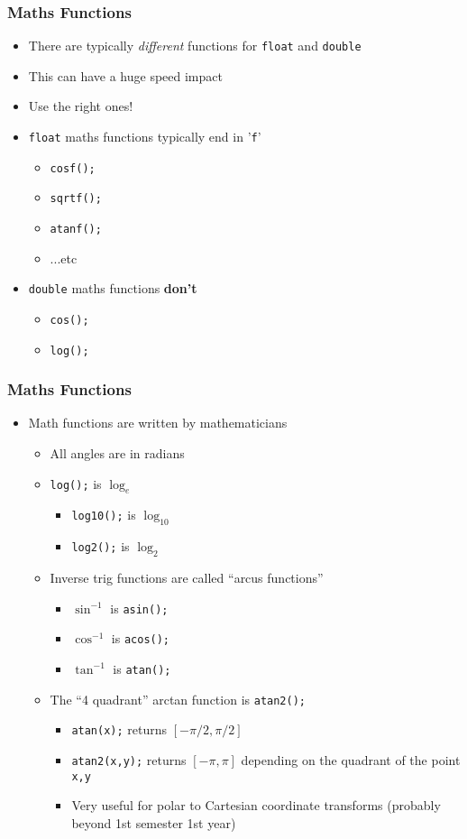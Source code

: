 \documentclass[14pt]{beamer}
\begin{document}
\begin{frame}
\frametitle{Maths Functions}
\begin{itemize}
\item There are typically \textit{different} functions for \texttt{float} and \texttt{double}
\item This can have a huge speed impact
\item Use the right ones!
\item \texttt{float} maths functions typically end in '\texttt{f}'
	\begin{itemize}
		\item \texttt{cosf();}
		\item \texttt{sqrtf();}
		\item \texttt{atanf();}
		\item ...etc
	\end{itemize}
\item \texttt{double} maths functions \textbf{don't}
	\begin{itemize}
		\item \texttt{cos();}
		\item \texttt{log();}
	\end{itemize}
\end{itemize}
\end{frame}

\begin{frame}
\frametitle{Maths Functions}
\begin{itemize}
\item Math functions are written by mathematicians
	\begin{itemize}
		\item All angles are in radians
		\pause
		\item \texttt{log();} is $\log_e$
			\begin{itemize}
				\item \texttt{log10();} is $\log_{10}$
				\item \texttt{log2();} is $\log_2$
			\end{itemize}
		\pause
		\item Inverse trig functions are called ``arcus functions''
			\begin{itemize}
				\item $\sin^{-1}$ is \texttt{asin();}
				\item $\cos^{-1}$ is \texttt{acos();}
				\item $\tan^{-1}$ is \texttt{atan();}
			\end{itemize}
		\pause
		\item The ``4 quadrant'' arctan function is \texttt{atan2();}
			\begin{itemize}
				\item \texttt{atan(x);} returns $[-\pi/2,\pi/2]$
				\item \texttt{atan2(x,y);} returns $[-\pi, \pi]$ depending on the quadrant of the point \texttt{x,y}
				\item Very useful for polar to Cartesian coordinate transforms (probably beyond 1st semester 1st year)
			\end{itemize}
	\end{itemize}
\end{itemize}
\end{frame}
\end{document}
